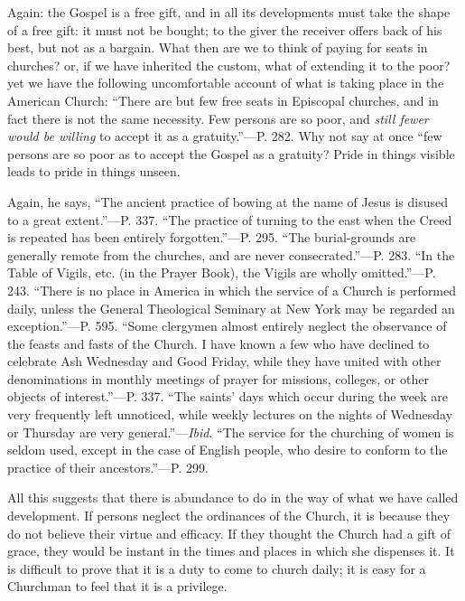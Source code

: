 Again: the Gospel is a free gift, and in all its
developments must take the shape of a free gift: it must not be
bought; to the giver the receiver offers back of his best, but not as
a bargain. What then are we to think of paying for seats in churches?
or, if we have inherited the custom, what of extending it to the poor?
yet we have the following uncomfortable account of what is taking
place in the American Church: ``There are but few free seats in
Episcopal churches, and in fact there is not the same necessity. Few
persons are so poor, and \emph{still fewer would be willing} to accept
it as a gratuity.''—P. 282. Why not say at once ``few persons are so
poor as to accept the Gospel as a gratuity? Pride in things visible
leads to pride in things unseen.

Again, he says, ``The ancient practice of bowing
at the name of Jesus is disused to a great extent.''—P. 337. ``The
practice of turning to the east when the Creed is repeated has
been entirely forgotten.''—P. 295. ``The burial-grounds are generally
remote from the churches, and are never consecrated.''—P. 283. ``In
the Table of Vigils, etc. (in the Prayer Book), the Vigils are wholly
omitted.''—P. 243. ``There is no place in America in which the service
of a Church is performed daily, unless the General Theological
Seminary at New York may be regarded an exception.''—P. 595. ``Some
clergymen almost entirely neglect the observance of the feasts and
fasts of the Church. I have known a few who have declined to celebrate
Ash Wednesday and Good Friday, while they have united with other
denominations in monthly meetings of prayer for missions, colleges, or
other objects of interest.''—P. 337. ``The saints' days which occur
during the week are very frequently left unnoticed, while weekly
lectures on the nights of Wednesday or Thursday are very general.''—\emph{Ibid}.
``The service for the churching of women is seldom used, except in the
case of English people, who desire to conform to the practice of their
ancestors.''—P. 299.

All this suggests that there is abundance to do
in the way of what we have called development. If persons neglect the
ordinances of the Church, it is because they do not believe their
virtue and efficacy. If they thought the Church had a gift of grace,
they would be instant in the times and places in which she dispenses
it. It is difficult to prove that it is a duty to come to church
daily; it is easy for a Churchman to feel that it is a privilege.

